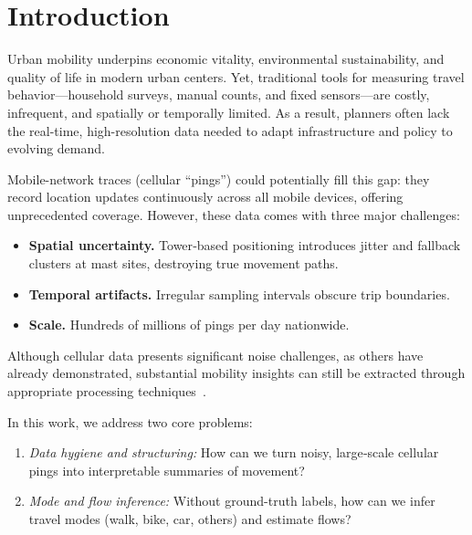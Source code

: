 \documentclass[fleqn,moreauthors,10pt]{ds_report}
\affiliation{\textit{Advisors: prof. dr. Tomaž Curk, Leon Hvastja}}
\begin{document}
\flushbottom 

\maketitle 

\thispagestyle{empty} 


\section*{Introduction}
Urban mobility underpins economic vitality, environmental sustainability, and quality of life in modern urban centers. Yet, traditional tools for measuring travel behavior—household surveys, manual counts, and fixed sensors—are costly, infrequent, and spatially or temporally limited. As a result, planners often lack the real-time, high-resolution data needed to adapt infrastructure and policy to evolving demand.

Mobile-network traces (cellular “pings”) could potentially fill this gap: they record location updates continuously across all mobile devices, offering unprecedented coverage. However, these data comes with three major challenges:

\begin{itemize}[nosep]
  \item \textbf{Spatial uncertainty.}  Tower‐based positioning introduces jitter and fallback clusters at mast sites, destroying true movement paths.  
  \item \textbf{Temporal artifacts.}  Irregular sampling intervals obscure trip boundaries.  
  \item \textbf{Scale.}  Hundreds of millions of pings per day nationwide.  
\end{itemize}

Although cellular data presents significant noise challenges, as others have already demonstrated, \cite{urbansensing}  substantial mobility insights can still be extracted through appropriate processing techniques~\cite{wang2010transport,asgari2016ctmapper}.

In this work, we address two core problems:
\begin{enumerate}[nosep]
  \item \emph{Data hygiene and structuring:} How can we turn noisy, large‐scale cellular pings into interpretable summaries of movement?  
  \item \emph{Mode and flow inference:} Without ground-truth labels, how can we infer travel modes (walk, bike, car, others) and estimate flows?
\end{enumerate}
\end{document}
